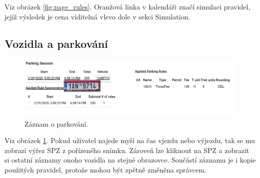 \noindent
Viz obrázek \ref{fig:page_rules}.
Oranžová linka v kalendáři značí simulaci pravidel, jejíž výsledek je cena viditelná vlevo
dole v sekci Simulation.

\subsection*{Vozidla a parkování}

\begin{figure} \centering
  \includegraphics[width=145mm]{../img/page_vehicles1.png}
  \caption{Záznam o parkování.}
  \label{fig:page_session}
\end{figure}

\noindent
Viz obrázek \ref{fig:page_session}.
Pokud uživatel najede myší na čas vjezdu nebo výjezdu, tak se mu zobrazí výřez SPZ z pořízeného snímku.
Zároveň lze kliknout na SPZ a zobrazit si ostatní záznamy onoho vozidla na stejné obrazovce.
Součástí záznamu je i kopie použitých pravidel, protože mohou být zpětně změněna správcem.
